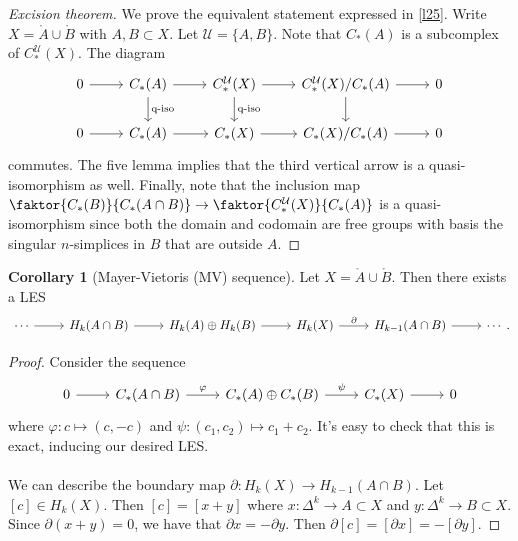 \documentclass[10pt,letterpaper,cm]{nupset}
\theoremstyle{definition}
\theoremstyle{theorem}
\newtheorem{corollary}[definition]{Corollary}
\theoremstyle{remark}
\newcommand{\U}{\mathcal U}
\newcommand{\1}{\mathbb{1}}
\newcommand{\0}{\vec 0}
\begin{document}
\begin{proof}[Excision theorem]
We prove the equivalent statement expressed in \cref{l25}. Write $X = \mathring{A}\cup \mathring{B}$ with $A,B\subset X$. Let $\U =\{A, B\}$. Note that $C_{\ast}(A)$ is a subcomplex of $C_{\ast}^{\U}(X)$. The diagram
\[
\begin{tikzcd}
0 \arrow[r] & C_{\ast}(A) \arrow[r] \arrow[d, "\text{q-iso}"] & C_{\ast}^{\U}(X) \arrow[r] \arrow[d, "\text{q-iso}"] & C_{\ast}^{\U}(X)/C_{\ast}(A) \arrow[r] \arrow[d] & 0 \\
0 \arrow[r] & C_{\ast}(A) \arrow[r]                          & C_{\ast}(X) \arrow[r]                                & C_{\ast}(X)/C_{\ast}(A) \arrow[r]                & 0
\end{tikzcd}
\] commutes. The five lemma implies that the third vertical arrow is a quasi-isomorphism as well. Finally, note that the inclusion map $\faktor{C_{\ast}(B)}{C_{\ast}(A\cap B)} \to \faktor{C_{\ast}^{\U}(X)}{C_{\ast}(A)}$ is a quasi-isomorphism since both the domain and codomain are free groups with basis the singular $n$-simplices in $B$ that are outside $A$.
\end{proof}

\begin{corollary}[Mayer-Vietoris (MV) sequence]
Let $X= \mathring{A} \cup \mathring{B}$. Then there exists a LES 
\[
\begin{tikzcd}
\cdots \arrow[r] & H_k(A\cap B) \arrow[r] & H_k(A)\oplus H_k(B) \arrow[r] & H_k(X) \arrow[r, "\partial"] & H_{k-1}(A\cap B) \arrow[r] & \cdots
\end{tikzcd}
.\]
\end{corollary}
\begin{proof}
Consider the sequence
\[
\begin{tikzcd}
0 \arrow[r] & C_{\ast}(A\cap B) \arrow[r, "\varphi"] & C_{\ast}(A)\oplus C_{\ast}(B) \arrow[r, "\psi"] & C_{\ast}(X) \arrow[r] & 0
\end{tikzcd}
\] where $\varphi : c \mapsto (c, -c)$ and $\psi : (c_1, c_2) \mapsto c_1 + c_2$. It's easy to check that this is exact, inducing our desired LES.
\\ \\ We can describe the boundary map $\partial : H_k(X) \to H_{k-1}(A\cap B)$. Let $[c] \in H_k(X)$. Then $[c] = [x+y]$ where $x : \Delta^k \to A\subset X$ and $y: \Delta^k \to B\subset X$. Since $\partial(x+y)  =0$, we have that $\partial{x}=-\partial{y}$. Then $\partial{[c]} =[\partial{x}] = {-}[\partial{y}]$.
\end{proof}
\end{document}
